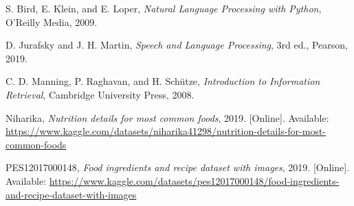 \documentclass[conference]{IEEEtran}
\begin{document}
\begin{thebibliography}{1}
S. Bird, E. Klein, and E. Loper, \textit{Natural Language Processing with Python}, O'Reilly Media, 2009.

D. Jurafsky and J. H. Martin, \textit{Speech and Language Processing}, 3rd ed., Pearson, 2019.

C. D. Manning, P. Raghavan, and H. Schütze, \textit{Introduction to Information Retrieval}, Cambridge University Press, 2008.

Niharika, \textit{Nutrition details for most common foods}, 2019. [Online]. Available: \url{https://www.kaggle.com/datasets/niharika41298/nutrition-details-for-most-common-foods}

PES12017000148, \textit{Food ingredients and recipe dataset with images}, 2019. [Online]. Available: \url{https://www.kaggle.com/datasets/pes12017000148/food-ingredients-and-recipe-dataset-with-images}
\end{thebibliography}
\end{document}
